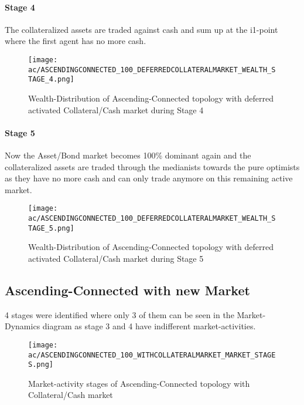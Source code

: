 \documentclass[Bachelorarbeit.tex]{subfiles}
\begin{document}
\paragraph{Stage 4}
The collateralized assets are traded against cash and sum up at the i1-point where the first agent has no more cash. 

\begin{figure}[H]
	\centering
  \texttt{[image: ac/ASCENDINGCONNECTED\_100\_DEFERREDCOLLATERALMARKET\_WEALTH\_STAGE\_4.png]}
  	\caption{Wealth-Distribution of Ascending-Connected topology with deferred activated Collateral/Cash market during Stage 4}
	\label{fig:markets_ASCENDINGCONNECTED_100_DEFERREDCOLLATERALMARKET_WEALTH_STAGE_4}
\end{figure}

\paragraph{Stage 5}
Now the Asset/Bond market becomes 100\% dominant again and the collateralized assets are traded through the medianists towards the pure optimists as they have no more cash and can only trade anymore on this remaining active market.

\begin{figure}[H]
	\centering
  \texttt{[image: ac/ASCENDINGCONNECTED\_100\_DEFERREDCOLLATERALMARKET\_WEALTH\_STAGE\_5.png]}
  	\caption{Wealth-Distribution of Ascending-Connected topology with deferred activated Collateral/Cash market during Stage 5}	\label{fig:markets_ASCENDINGCONNECTED_100_DEFERREDCOLLATERALMARKET_WEALTH_STAGE_5}
\end{figure}

\subsection{Ascending-Connected with new Market}

4 stages were identified where only 3 of them can be seen in the Market-Dynamics diagram as stage 3 and 4 have indifferent market-activities.

\begin{figure}[H]
	\centering
  \texttt{[image: ac/ASCENDINGCONNECTED\_100\_WITHCOLLATERALMARKET\_MARKET\_STAGES.png]}
  	\caption{Market-activity stages of Ascending-Connected topology with Collateral/Cash market}
	\label{fig:markets_ASCENDINGCONNECTED_100_WITHCOLLATERALMARKET_MARKET_STAGES}
\end{figure}
\end{document}
